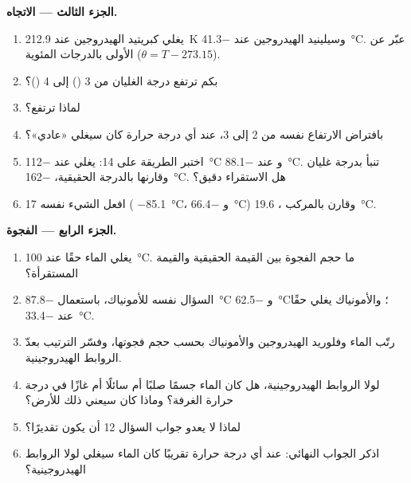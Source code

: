 \begin{problem}
\medskip
\noindent\textbf{الجزء الثالث --- الاتجاه.}
\begin{enumerate}[resume]
  \item يغلي كبريتيد الهيدروجين عند \qty{212.9}{K} وسيلينيد الهيدروجين عند
        \qty{-41.3}{\celsius}. عبّر عن الأولى بالدرجات المئوية
        ($\theta = T - 273.15$).
  \item بكم ترتفع درجة الغليان من  3
        () إلى  4 ()؟
  \item لماذا ترتفع؟
  \item بافتراض الارتفاع نفسه من  2 إلى  3، عند أي درجة
        حرارة كان سيغلي  «عادي»؟
  \item اختبر الطريقة على  14: يغلي  عند
        \qty{-112}{\celsius} و عند \qty{-88.1}{\celsius}.
        تنبأ بدرجة غليان  وقارنها بالدرجة
        الحقيقية، \qty{-162}{\celsius}. هل الاستقراء دقيق؟
  \item افعل الشيء نفسه  17 ( \qty{-85.1}{\celsius}،
        و \qty{-66.4}{\celsius}) وقارن بالمركب ،
        \qty{19.6}{\celsius}.
\end{enumerate}

\medskip
\noindent\textbf{الجزء الرابع --- الفجوة.}
\begin{enumerate}[resume]
  \item يغلي الماء حقًا عند \qty{100}{\celsius}. ما حجم الفجوة
        بين القيمة الحقيقية والقيمة المستقرأة؟
  \item السؤال نفسه للأمونياك، باستعمال  \qty{-87.8}{\celsius}
        و \qty{-62.5}{\celsius}؛ والأمونياك يغلي حقًا عند
        \qty{-33.4}{\celsius}.
  \item رتّب الماء وفلوريد الهيدروجين والأمونياك بحسب حجم
        فجوتها، وفسّر الترتيب بعدّ الروابط الهيدروجينية.
  \item لولا الروابط الهيدروجينية، هل كان الماء جسمًا صلبًا أم سائلًا أم غازًا
        في درجة حرارة الغرفة؟ وماذا كان سيعني ذلك للأرض؟
  \item لماذا لا يعدو جواب السؤال 12 أن يكون تقديرًا؟
  \item اذكر الجواب النهائي: عند أي درجة حرارة تقريبًا كان الماء سيغلي لولا
        الروابط الهيدروجينية؟
\end{enumerate}
\end{problem}
